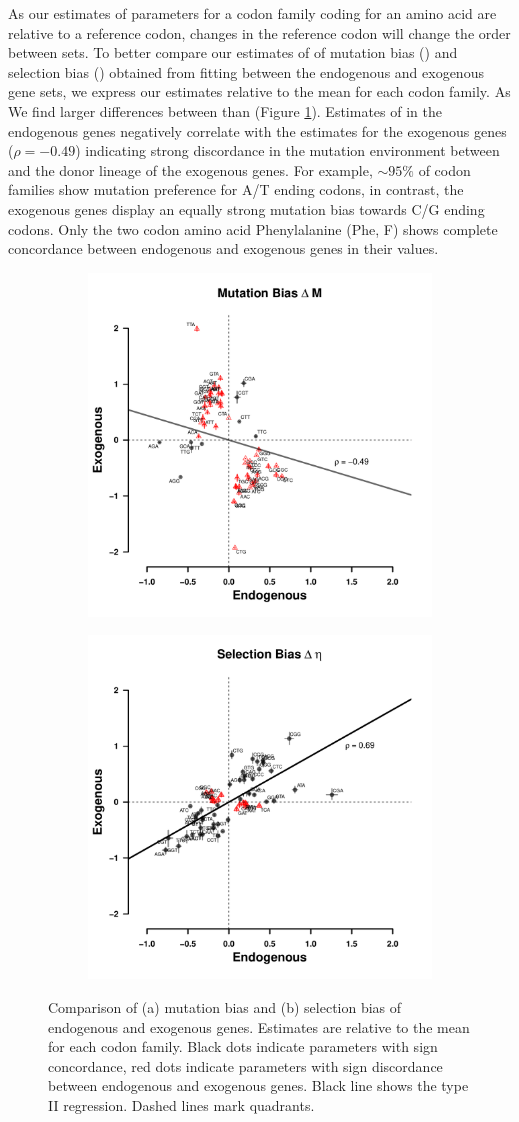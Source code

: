 \documentclass[12pt]{article}
\begin{document}
As our estimates of parameters for a codon family coding for an amino acid are relative to a reference codon, changes in the reference codon will change the order between sets.
To better compare our estimates of of mutation bias (\DM) and selection bias (\DE) obtained from fitting \ROC between the endogenous and exogenous gene sets, we express our estimates relative to the mean for each codon family.
As 
We find larger differences between \DM than \DE (Figure \ref{fig:csp_comp}). 
Estimates of \DM in the endogenous genes negatively correlate with the \DM estimates for the exogenous genes ($\rho = -0.49$) indicating strong discordance in the mutation environment between \kluyveri and the donor lineage of the exogenous genes.
For example, $\sim 95 \%$ of codon families show mutation preference for A/T ending codons, in contrast, the exogenous genes display an equally strong mutation bias towards C/G ending codons.
Only the two codon amino acid Phenylalanine (Phe, F) shows complete concordance between endogenous and exogenous genes in their \DM values.
\begin{figure}[h]
    \centering
    \begin{subfigure}
        \centering
        \includegraphics[width=.45\textwidth]{img/csp_corr_dm.pdf}
    \end{subfigure}
    \begin{subfigure}
        \centering
        \includegraphics[width=.45\textwidth]{img/csp_corr_deta.pdf}
    \end{subfigure}
    \caption{Comparison of (a) mutation bias \DM and (b) selection bias \DE of endogenous and exogenous genes. Estimates are relative to the mean for each codon family. Black dots indicate parameters with sign concordance, red dots indicate parameters with sign discordance between endogenous and exogenous genes. Black line shows the type II regression. Dashed lines mark quadrants.}
    \label{fig:csp_comp}
\end{figure}
\end{document}

